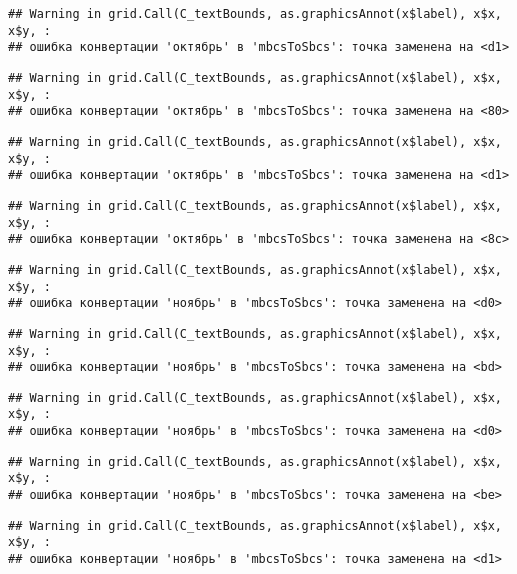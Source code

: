 \documentclass[
]{article}
\begin{document}
\begin{verbatim}
## Warning in grid.Call(C_textBounds, as.graphicsAnnot(x$label), x$x, x$y, :
## ошибка конвертации 'октябрь' в 'mbcsToSbcs': точка заменена на <d1>
\end{verbatim}

\begin{verbatim}
## Warning in grid.Call(C_textBounds, as.graphicsAnnot(x$label), x$x, x$y, :
## ошибка конвертации 'октябрь' в 'mbcsToSbcs': точка заменена на <80>
\end{verbatim}

\begin{verbatim}
## Warning in grid.Call(C_textBounds, as.graphicsAnnot(x$label), x$x, x$y, :
## ошибка конвертации 'октябрь' в 'mbcsToSbcs': точка заменена на <d1>
\end{verbatim}

\begin{verbatim}
## Warning in grid.Call(C_textBounds, as.graphicsAnnot(x$label), x$x, x$y, :
## ошибка конвертации 'октябрь' в 'mbcsToSbcs': точка заменена на <8c>
\end{verbatim}

\begin{verbatim}
## Warning in grid.Call(C_textBounds, as.graphicsAnnot(x$label), x$x, x$y, :
## ошибка конвертации 'ноябрь' в 'mbcsToSbcs': точка заменена на <d0>
\end{verbatim}

\begin{verbatim}
## Warning in grid.Call(C_textBounds, as.graphicsAnnot(x$label), x$x, x$y, :
## ошибка конвертации 'ноябрь' в 'mbcsToSbcs': точка заменена на <bd>
\end{verbatim}

\begin{verbatim}
## Warning in grid.Call(C_textBounds, as.graphicsAnnot(x$label), x$x, x$y, :
## ошибка конвертации 'ноябрь' в 'mbcsToSbcs': точка заменена на <d0>
\end{verbatim}

\begin{verbatim}
## Warning in grid.Call(C_textBounds, as.graphicsAnnot(x$label), x$x, x$y, :
## ошибка конвертации 'ноябрь' в 'mbcsToSbcs': точка заменена на <be>
\end{verbatim}

\begin{verbatim}
## Warning in grid.Call(C_textBounds, as.graphicsAnnot(x$label), x$x, x$y, :
## ошибка конвертации 'ноябрь' в 'mbcsToSbcs': точка заменена на <d1>
\end{verbatim}
\end{document}
